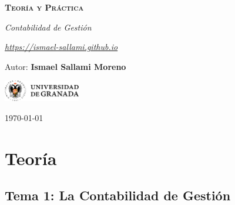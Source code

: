 \documentclass[12pt]{report} %
\begin{document}
\begin{titlepage}
    \begin{center}
        \vspace*{2cm}
        
        {\Huge \bfseries\scshape Teoría y Práctica \par}
        \vspace{0.5cm}
        {\Large \itshape Contabilidad de Gestión \par}
        \vspace{0.5cm}
        {\Large \itshape \href{https://ismael-sallami.github.io}{https://ismael-sallami.github.io} \par}


        \vfill
        
        {\LARGE Autor: \textbf{Ismael Sallami Moreno} \par}
        \vspace{0.3cm}
        
        \vspace{1cm}
        \includegraphics[width=0.25\textwidth]{../../../extraFiles/img/ugr.png} %
        \vspace{1cm}
        
        {\large \today}
    \end{center}
    
    \restoregeometry
\end{titlepage}


\thispagestyle{empty} %
\clearpage

\tableofcontents
\thispagestyle{empty} %
\clearpage

\part{Teoría}

\hypertarget{tema-1-la-contabilidad-de-gestiuxf3n}{%
\chapter{Tema 1: La Contabilidad de
Gestión}\label{tema-1-la-contabilidad-de-gestiuxf3n}}
\end{document}
